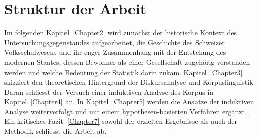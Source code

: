 \section{Struktur der Arbeit}

Im folgenden Kapitel~\ref{Chapter2} wird zunächst der historische Kontext des Untersuchungsgegenstandes aufgearbeitet, die Geschichte des Schweizer Volksschulwesens und ihr enger Zusammenhang mit der Entstehung des modernen Staates, dessen Bewohner als einer Gesellschaft zugehörig verstanden werden und welche Bedeutung der Statistik darin zukam. Kapitel~\ref{Chapter3} skizziert den theoretischen Hintergrund der Diskursanalyse und Korpuslinguistik. Daran schliesst der Versuch einer induktiven Analyse des Korpus in Kapitel~\ref{Chapter4} an. In Kapitel~\ref{Chapter5} werden die Ansätze der induktiven Analyse weiterverfolgt und mit einem hypothesen-basierten Verfahren ergänzt. Ein kritisches Fazit~\ref{Chapter7} sowohl der erzielten Ergebnisse als auch der Methodik schliesst die Arbeit ab. 